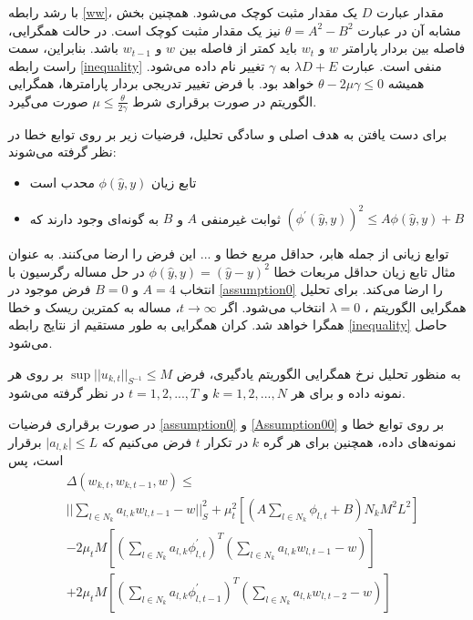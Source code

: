 با رشد رابطه \ref{ww}، مقدار عبارت $D$ یک مقدار مثبت کوچک می‌شود. همچنین بخش مشابه آن در عبارت $\theta=A^2-B^2$ نیز یک مقدار مثبت کوچک است. در حالت همگرایی، فاصله بین بردار پارامتر $w$ و $w_{t}$  باید کمتر از فاصله بین  $w$ و $w_{t-1}$ باشد. بنابراین، سمت راست رابطه \ref{inequality} منفی است. عبارت $\lambda D+E$ به $\gamma$  تغییر نام داده می‌شود. همیشه $\theta-2\mu \gamma\le 0$ خواهد بود. با فرض تغییر تدریجی بردار پارامترها، همگرایی الگوریتم  در صورت برقراری شرط $\mu \le \frac{\theta}{2\gamma}$ صورت می‌گیرد. 
\begin{assumption}\label{assumption0}
	برای دست یافتن به هدف اصلی و سادگی تحلیل، فرضیات زیر بر روی توابع خطا در نظر گرفته می‌شوند:
	\begin{itemize}
		\item تابع زیان $\phi(\hat{y},y)$ محدب است
		\item ثوابت غیرمنفی $A$ و $B$ به گونه‌ای وجود دارند که $(\phi^{'}(\hat{y},y))^2\leq A\phi(\hat{y},y)+B$
	\end{itemize} 
\end{assumption}

توابع زیانی از جمله هابر، حداقل مربع خطا و ... این فرض را ارضا می‌کنند. به عنوان مثال تابع زیان حداقل مربعات خطا $\phi(\hat{y},y)=(\hat{y}-y)^2$ در حل مساله رگرسیون با انتخاب  $A=4$ و $B=0$  فرض موجود در \ref{assumption0} را ارضا می‌کند. 
برای تحلیل همگرایی الگوریتم ،  $\lambda=0$  انتخاب می‌شود. اگر $t\rightarrow\infty$، مساله به کمترین ریسک و خطا همگرا خواهد شد. کران همگرایی به طور مستقیم از نتایج رابطه \ref{inequality} حاصل می‌شود. 

\begin{assumption}\label{Assumption00}
	به منظور تحلیل نرخ همگرایی الگوریتم یادگیری، فرض $\sup\lvert\lvert u_{k,t}\rvert\rvert_{S^{-1}}\leq M$ بر روی هر نمونه داده و برای هر $k=1, 2, ..., N$ و $t=1, 2, ..., T$ در نظر گرفته می‌شود. 
\end{assumption}

\begin{theorem}\label{Theorem00}
	در صورت برقراری فرضیات \ref{assumption0} و \ref{Assumption00} بر روی توابع خطا و نمونه‌های داده، همچنین برای هر گره $k$ در تکرار $t$ فرض می‌کنیم که $\lvert a_{l,k}\rvert\leq L$ برقرار است، پس
	\begin{equation}\label{eq6}
		\begin{split}
			&\Delta(w_{k,t},w_{k,t-1},w)\leq \\
			&\lvert\lvert \sum_{l\in N_k}{a_{l,k}w_{l,t-1}-w} \rvert\rvert^2_S+\mu^2_t \left[(A\sum_{l\in N_k}\phi_{l,t} +B)N_kM^2L^2\right]\\
			&-2\mu_t M\left[(\sum_{l\in N_k}a_{l,k}\phi^{'}_{l,t})^T(\sum_{l\in N_k}a_{l,k}w_{l,t-1}-w)\right]\\
			&+2\mu_t M\left[(\sum_{l\in N_k}a_{l,k}\phi^{'}_{l,t-1})^T(\sum_{l\in N_k}a_{l,k}w_{l,t-2}-w)\right]
		\end{split}
	\end{equation}
\end{theorem}

